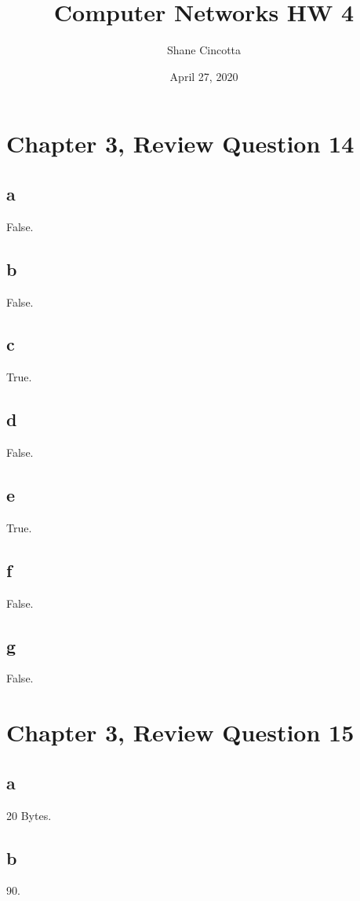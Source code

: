 \documentclass{article}
\title{Computer Networks HW 4}
\author{Shane Cincotta }
\date{April 27, 2020}
\begin{document}
\maketitle

\section*{Chapter 3, Review Question 14}
\subsection*{a} False.\\
\subsection*{b} False.\\
\subsection*{c} True.\\
\subsection*{d} False.\\
\subsection*{e} True.\\
\subsection*{f} False.\\
\subsection*{g} False.\\

\section*{Chapter 3, Review Question 15}
\subsection*{a} 20 Bytes.\\
\subsection*{b} 90.\\
\end{document}
